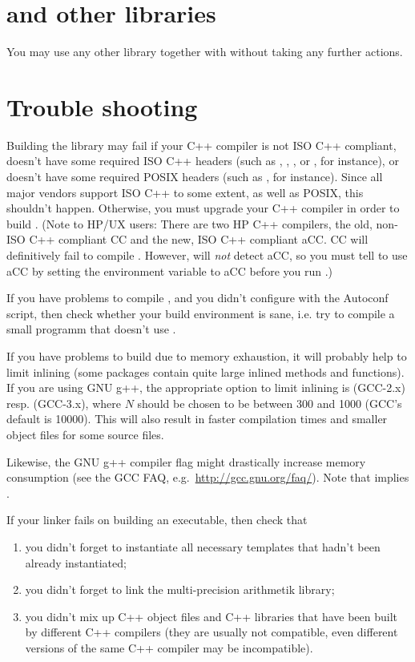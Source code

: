 \section{\LiDIA and other libraries}

You may use any other library together with \LiDIA without taking any
further actions.


\section{Trouble shooting}
Building the library may fail if your C++ compiler is not ISO C++
compliant, doesn't have some required ISO C++ headers (such as
, , , or ,
for instance), or doesn't have some required POSIX headers (such as
, for instance).  Since all major vendors support ISO C++
to some extent, as well as POSIX, this shouldn't happen.  Otherwise, you
must upgrade your C++ compiler in order to build \LiDIA.  (Note to HP/UX
users: There are two HP C++ compilers, the old, non-ISO C++ compliant CC
and the new, ISO C++ compliant aCC.  CC will definitively fail to compile
\LiDIA.  However,  will \emph{not} detect aCC, so you must
tell  to use aCC by setting the environment variable
 to aCC before you run .)

If you have problems to compile \LiDIA, and you didn't configure \LiDIA
with the Autoconf  script, then check whether your build
environment is sane, i.e. try to compile a small programm that doesn't use
\LiDIA.

If you have problems to build \LiDIA due to memory exhaustion, it will
probably help to limit inlining (some packages contain quite large inlined
methods and functions).  If you are using GNU g++, the appropriate option
to limit inlining is  (GCC-2.x) resp.
 (GCC-3.x), where $N$ should be chosen to be
between 300 and 1000 (GCC's default is 10000).  This will also result in
faster compilation times and smaller object files for some source files.

Likewise, the GNU g++ compiler flag  might drastically
increase memory consumption (see the GCC FAQ, e.g.\
\url{http://gcc.gnu.org/faq/}).  Note that  implies
.

If your linker fails on building an executable, then check that
\begin{enumerate}
\item you didn't forget to instantiate all necessary templates that hadn't
been already instantiated;
\item you didn't forget to link the multi-precision arithmetik library;
\item you didn't mix up C++ object files and C++ libraries that have been
built by different C++ compilers (they are usually not compatible, even
different versions of the same C++ compiler may be incompatible).
\end{enumerate}


